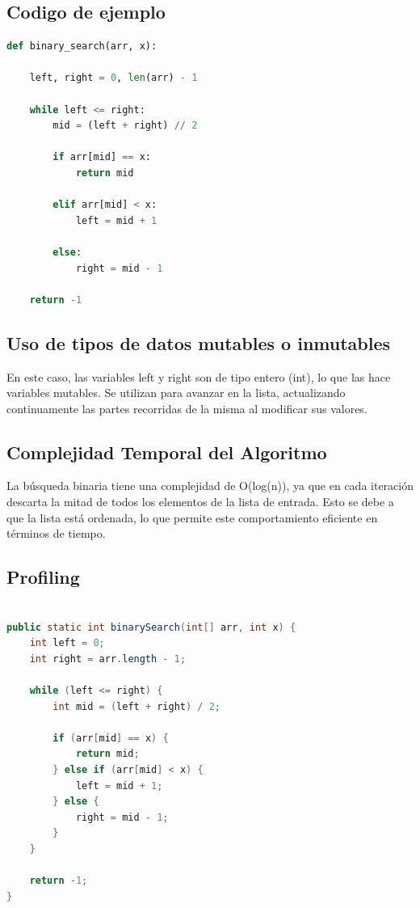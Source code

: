 \documentclass{article}
\begin{document}
\subsection{Codigo de ejemplo}
\begin{lstlisting}[language=Python, caption=Ejemplo de código en Python]
def binary_search(arr, x):

    left, right = 0, len(arr) - 1

    while left <= right:
        mid = (left + right) // 2

        if arr[mid] == x:
            return mid

        elif arr[mid] < x:
            left = mid + 1

        else:
            right = mid - 1

    return -1

\end{lstlisting}

\subsection{Uso de tipos de datos mutables o inmutables}
En este caso, las variables left y right son de tipo entero (int), lo que las hace variables mutables. Se utilizan para avanzar en la lista, actualizando continuamente las partes recorridas de la misma al modificar sus valores.

\subsection{Complejidad Temporal del Algoritmo}
La búsqueda binaria tiene una complejidad de O(log(n)), ya que en cada iteración descarta la mitad de todos los elementos de la lista de entrada. Esto se debe a que la lista está ordenada, lo que permite este comportamiento eficiente en términos de tiempo.

\subsection{Profiling}

\begin{lstlisting}[language=Java, caption=Ejemplo de código en Java]

public static int binarySearch(int[] arr, int x) {
    int left = 0;
    int right = arr.length - 1;

    while (left <= right) {
        int mid = (left + right) / 2;

        if (arr[mid] == x) {
            return mid;
        } else if (arr[mid] < x) {
            left = mid + 1;
        } else {
            right = mid - 1;
        }
    }

    return -1;
}
\end{lstlisting}
\end{document}
